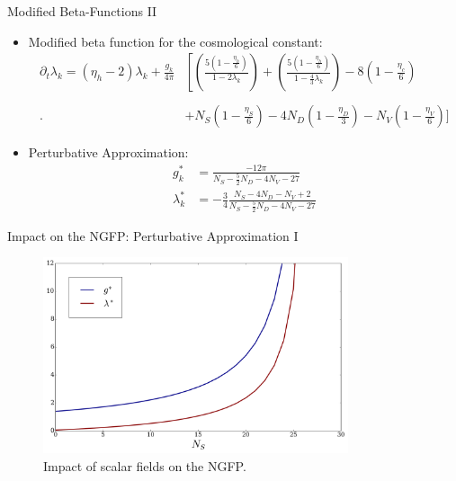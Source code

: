 \documentclass{beamer}
\begin{document}
\begin{frame}{Modified Beta-Functions II}
\begin{itemize}
	\item Modified beta function for the cosmological constant:
	\small{
\begin{align}
	\partial_t\lambda_k = \left(\eta_h - 2\right)\lambda_k + \frac{g_k}{4\pi}&\left[\left(\frac{5\left(1-\frac{\eta_h}{6}\right)}{1-2\lambda_k}\right) + \left(\frac{5\left(1-\frac{\eta_h}{6}\right)}{1-\frac{4}{3}\lambda_k}\right) - 8\left(1-\frac{\eta_c}{6}\right)\right. \nonumber\\
	\phantom{.}\\ 
	\Biggl. &+ N_S\left(1-\frac{\eta_S}{6}\right) - 4N_D\left(1-\frac{\eta_D}{3}\right) - N_V\left(1- \frac{\eta_V}{6}\right)\Biggr]\nonumber
\end{align}}
\normalsize
\item Perturbative Approximation:
\begin{equation}
 	\begin{aligned}
 		g_k^{*} &= \frac{-12\pi}{N_S - \frac{5}{2}N_D - 4N_V-27} \\[10pt]
 		\lambda_k^{*} &= -\frac{3}{4}\frac{N_S - 4N_D-N_V+2}{N_S - \frac{5}{2}N_D-4N_V-27}
 	\end{aligned}
 \end{equation}
\end{itemize}	
\end{frame}

\begin{frame}{Impact on the NGFP: Perturbative Approximation I}
	 \begin{figure}[H]
 \centering
 	\includegraphics[width= 0.8\textwidth]{figures/FP_scalars}
 	 \caption{Impact of scalar fields on the NGFP.}	
 \end{figure}
\end{frame}
\end{document}
